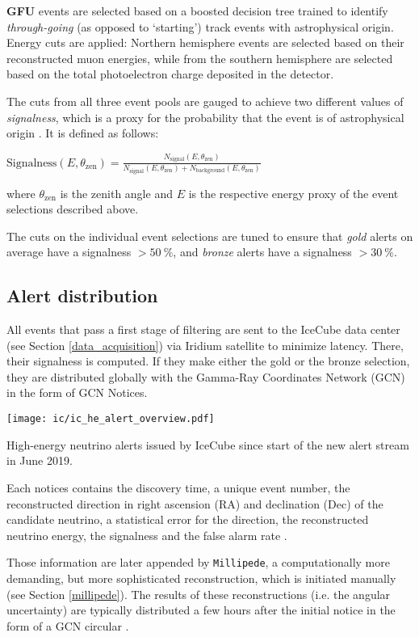 \textbf{GFU} events are selected based on a boosted decision tree trained to identify \textit{through-going} (as opposed to `starting') track events with astrophysical origin. Energy cuts are applied: Northern hemisphere events are selected based on their reconstructed muon energies, while from the southern hemisphere are selected based on the total photoelectron charge deposited in the detector.

The cuts from all three event pools are gauged to achieve two different values of \textit{signalness}, which is a proxy for the probability that the event is of astrophysical origin \cite{Tung2019}. It is defined as follows:
\begin{definition}\label{signalness_def}
$\text{Signalness}(E,\theta_\text{zen}) = \frac{N_\text{signal}(E,\theta_\text{zen})}{N_\text{signal}(E,\theta_\text{zen})+N_\text{background}(E,\theta_\text{zen})}$
\end{definition}
where $\theta_\text{zen}$ is the zenith angle and $E$ is the respective energy proxy of the event selections described above.

The cuts on the individual event selections are tuned to ensure that \textit{gold} alerts on average have a signalness $>\SI{50}{\percent}$, and \textit{bronze} alerts have a signalness $>\SI{30}{\percent}$.
\subsection{Alert distribution} \label{ic_alerts}
All events that pass a first stage of filtering are sent to the IceCube data center (see Section \ref{data_acquisition}) via Iridium satellite to minimize latency. There, their signalness is computed. If they make either the gold or the bronze selection, they are distributed globally with the Gamma-Ray Coordinates Network (GCN) in the form of GCN Notices.
\begin{marginfigure}
    \texttt{[image: ic/ic\_he\_alert\_overview.pdf]}
    \caption[IceCube alert overview]{High-energy neutrino alerts issued by IceCube since start of the new alert stream in June 2019.}
\end{marginfigure}
Each notices contains the discovery time, a unique event number, the reconstructed direction in right ascension (RA) and declination (Dec) of the candidate neutrino, a statistical error for the direction, the reconstructed neutrino energy, the signalness and the false alarm rate \cite{Tung2019}.

Those information are later appended by \texttt{Millipede}, a computationally more demanding, but more sophisticated reconstruction, which is initiated manually (see Section \ref{millipede}). The results of these reconstructions (i.e. the angular uncertainty) are typically distributed a few hours after the initial notice in the form of a GCN circular \cite{Tung2019}.

